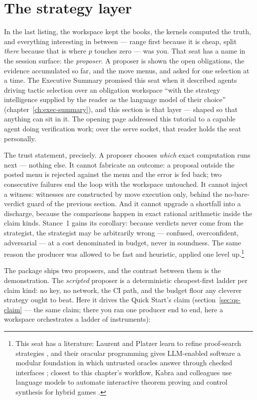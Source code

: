 \section{The strategy layer}
\label{sec:tut-strategy}

In the last listing, the workspace kept the books, the kernels
computed the truth, and everything interesting in between --- range
first because it is cheap, split \emph{there} because that is where
$p$ touches zero --- was you. That seat has a name in the session
surface: the \emph{proposer}. A proposer is shown the open
obligations, the evidence accumulated so far, and the move menus,
and asked for one selection at a time. The Executive Summary
promised this seat when it described agents driving tactic selection
over an obligation workspace ``with the strategy intelligence
supplied by the reader as the language model of their choice''
(chapter~\ref{ch:exec-summary}), and this section is
that layer --- shaped so that anything can sit in it. The opening
page addressed this tutorial to a capable agent doing verification
work; over the serve socket, that reader holds the seat personally.

The trust statement, precisely. A proposer chooses \emph{which}
exact computation runs next --- nothing else. It cannot fabricate an
outcome: a proposal outside the posted menu is rejected against the
menu and the error is fed back; two consecutive failures end the
loop with the workspace untouched. It cannot inject a witness:
witnesses are constructed by move execution only, behind the
no-bare-verdict guard of the previous section. And it cannot upgrade
a shortfall into a discharge, because the comparisons happen in
exact rational arithmetic inside the claim kinds. Stance~1 gains its
corollary: because verdicts never come from the strategist, the
strategist may be arbitrarily wrong --- confused, overconfident,
adversarial --- at a cost denominated in budget, never in soundness.
The same reason the producer was allowed to be fast and heuristic,
applied one level up.\footnote{This seat has a literature: Laurent
  and Platzer learn to refine proof-search strategies
  \cite{laurent22}, and their oracular programming gives LLM-enabled
  software a modular foundation in which untrusted oracles answer
  through checked interfaces \cite{laurent25}; closest to this
  chapter's workflow, Kabra and colleagues use language models to
  automate interactive theorem proving and control synthesis for
  hybrid games \cite{kabra26}.}

The package ships two proposers, and the contrast between them is
the demonstration. The \emph{scripted} proposer is a deterministic
cheapest-first ladder per claim kind: no key, no network, the CI
path, and the budget floor any cleverer strategy ought to beat. Here
it drives the Quick Start's claim (section~\ref{sec:qs-claim} ---
the same claim; there you ran one producer end to end, here a
workspace orchestrates a ladder of instruments):

